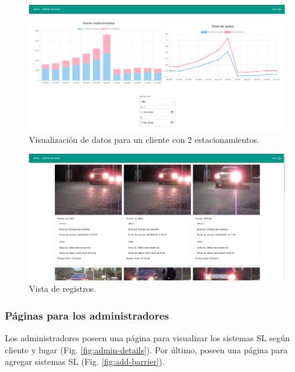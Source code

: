 \begin{figure}[bth]
    \centering
    \includegraphics[width=\textwidth]{imgs/server/resume.png}
    \caption{Visualización de datos para un cliente con 2 estacionamientos.}
    \label{fig:dashboard}
\end{figure}

\begin{figure}[bth]
    \centering
    \includegraphics[width=\textwidth]{imgs/server/registers.png}
    \caption{Vista de registros.}
    \label{fig:registers}
\end{figure}



\subsubsection{Páginas para los administradores}

Los administradores poseen una página para visualizar los sistemas SL según cliente y lugar (Fig. \ref{fig:admin-details}). Por último, poseen una página para agregar sistemas SL (Fig. \ref{fig:add-barrier}).

